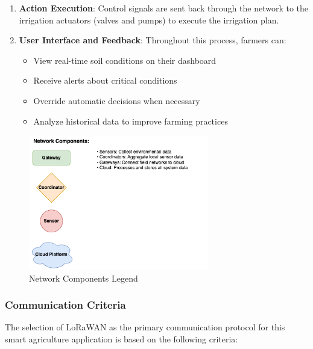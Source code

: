 \documentclass[12pt,a4paper]{article}
\begin{document}
\begin{enumerate}
    \item \textbf{Action Execution}: Control signals are sent back through the network to the irrigation actuators (valves and pumps) to execute the irrigation plan.
    
    \item \textbf{User Interface and Feedback}: Throughout this process, farmers can:
    \begin{itemize}
        \item View real-time soil conditions on their dashboard
        \item Receive alerts about critical conditions
        \item Override automatic decisions when necessary
        \item Analyze historical data to improve farming practices
    \end{itemize}
\end{enumerate}

\begin{figure}[H]
\centering
\includegraphics[width=0.7\textwidth]{img/drawio/legend.png}
\caption{Network Components Legend}
\label{fig:legend}
\end{figure}

\subsubsection{Communication Criteria}

The selection of LoRaWAN as the primary communication protocol for this smart agriculture application is based on the following criteria:
\end{document}
